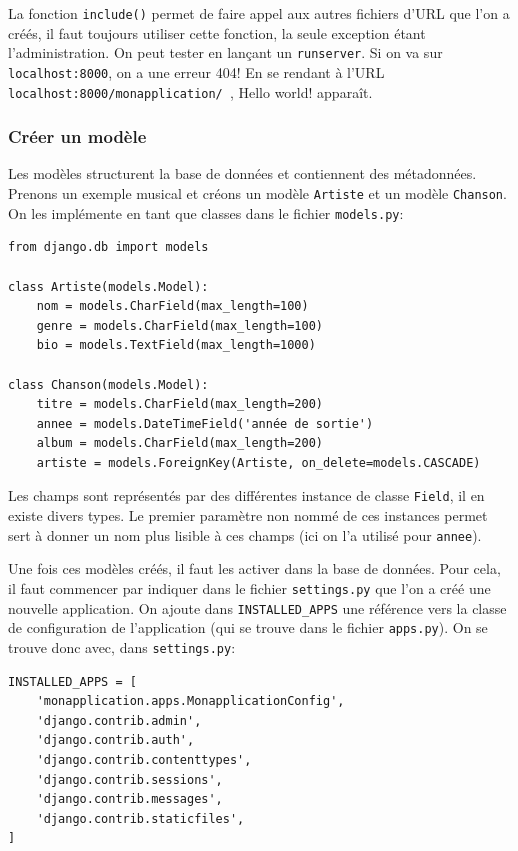 \documentclass[a4paper, 10pt]{article}
\begin{document}
La fonction \texttt{include()} permet de faire appel aux autres fichiers d’URL que l'on a créés, il faut toujours utiliser cette fonction, la seule exception étant l'administration. On peut tester en lançant un \texttt{runserver}. Si on va sur \texttt{localhost:8000}, on a une erreur 404! En se rendant à l'URL \texttt{localhost:8000/monapplication/ }, Hello world! apparaît.

\subsubsection{Créer un modèle}
Les modèles structurent la base de données et contiennent des métadonnées. Prenons un exemple musical et créons un modèle \texttt{Artiste} et un modèle \texttt{Chanson}. On les implémente en tant que classes dans le fichier \texttt{models.py}:
\begin{verbatim}
from django.db import models

class Artiste(models.Model):
    nom = models.CharField(max_length=100)
    genre = models.CharField(max_length=100)
    bio = models.TextField(max_length=1000)

class Chanson(models.Model):
    titre = models.CharField(max_length=200)
    annee = models.DateTimeField('année de sortie')
    album = models.CharField(max_length=200)
    artiste = models.ForeignKey(Artiste, on_delete=models.CASCADE)
\end{verbatim}

Les champs sont représentés par des différentes instance de classe \texttt{Field}, il en existe divers types. Le premier paramètre non nommé de ces instances permet sert à donner un nom plus lisible à ces champs (ici on l'a utilisé pour \texttt{annee}).\bigskip

Une fois ces modèles créés, il faut les activer dans la base de données. Pour cela, il faut commencer par indiquer dans le fichier \texttt{settings.py} que l'on a créé une nouvelle application. On ajoute dans \texttt{INSTALLED\_APPS} une référence vers la classe de configuration de l'application (qui se trouve dans le fichier \texttt{apps.py}). On se trouve donc avec, dans \texttt{settings.py}:

\begin{verbatim}
INSTALLED_APPS = [
    'monapplication.apps.MonapplicationConfig',
    'django.contrib.admin',
    'django.contrib.auth',
    'django.contrib.contenttypes',
    'django.contrib.sessions',
    'django.contrib.messages',
    'django.contrib.staticfiles',
]
\end{verbatim}
\end{document}
